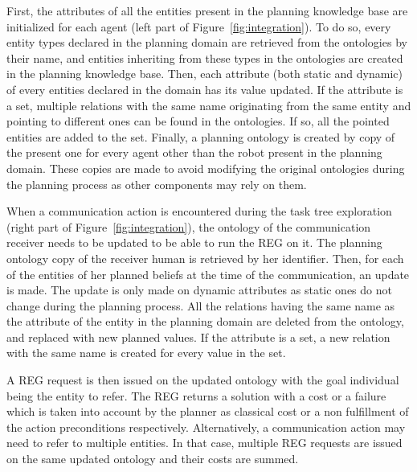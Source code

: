 \documentclass[a4paper,11pt,twoside]{StyleThese}
\begin{document}
First, the attributes of all the entities present in the planning knowledge base are initialized for each agent (left part of Figure~\ref{fig:integration}). To do so, every entity types declared in the planning domain are retrieved from the ontologies by their name, and entities inheriting from these types in the ontologies are created in the planning knowledge base. Then, each attribute (both static and dynamic) of every entities declared in the domain has its value updated. If the attribute is a set, multiple relations with the same name originating from the same entity and pointing to different ones can be found in the ontologies. If so, all the pointed entities are added to the set.
Finally, a planning ontology is created by copy of the present one for every agent other than the robot present in the planning domain. These copies are made to avoid modifying the original ontologies during the planning process as other components may rely on them.


When a communication action is encountered during the task tree exploration (right part of Figure~\ref{fig:integration}), the ontology of the communication receiver needs to be updated to be able to run the REG on it.
The planning ontology copy of the receiver human is retrieved by her identifier. Then, for each of the entities of her planned beliefs at the time of the communication, an update is made. The update is only made on dynamic attributes as static ones do not change during the planning process. All the relations having the same name as the attribute of the entity in the planning domain are deleted from the ontology, and replaced with new planned values. If the attribute is a set, a new relation with the same name is created for every value in the set.

A REG request is then issued on the updated ontology with the goal individual being the entity to refer. The REG returns a solution with a cost or a failure which is taken into account by the planner as classical cost or a non fulfillment of the action preconditions respectively. Alternatively, a communication action may need to refer to multiple entities. In that case, multiple REG requests are issued on the same updated ontology and their costs are summed.
\end{document}
